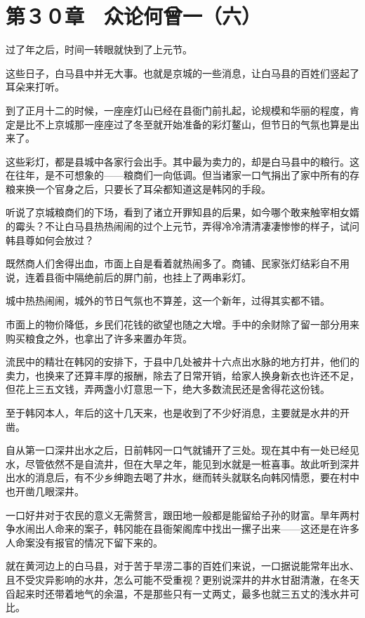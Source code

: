 \section{第３０章　众论何曾一（六）}

过了年之后，时间一转眼就快到了上元节。

这些日子，白马县中并无大事。也就是京城的一些消息，让白马县的百姓们竖起了耳朵来打听。

到了正月十二的时候，一座座灯山已经在县衙门前扎起，论规模和华丽的程度，肯定是比不上京城那一座座过了冬至就开始准备的彩灯鳌山，但节日的气氛也算是出来了。

这些彩灯，都是县城中各家行会出手。其中最为卖力的，却是白马县中的粮行。这在往年，是不可想象的——粮商们一向低调。但当诸家一口气捐出了家中所有的存粮来换一个官身之后，只要长了耳朵都知道这是韩冈的手段。

听说了京城粮商们的下场，看到了诸立开罪知县的后果，如今哪个敢来触宰相女婿的霉头？不让白马县热热闹闹的过个上元节，弄得冷冷清清凄凄惨惨的样子，试问韩县尊如何会放过？

既然商人们舍得出血，市面上自是看着就热闹多了。商铺、民家张灯结彩自不用说，连着县衙中隔绝前后的屏门前，也挂上了两串彩灯。

城中热热闹闹，城外的节日气氛也不算差，这一个新年，过得其实都不错。

市面上的物价降低，乡民们花钱的欲望也随之大增。手中的余财除了留一部分用来购买粮食之外，也拿出了许多来置办年货。

流民中的精壮在韩冈的安排下，于县中几处被井十六点出水脉的地方打井，他们的卖力，也换来了还算丰厚的报酬，除去了日常开销，给家人换身新衣也许还不足，但花上三五文钱，弄两盏小灯意思一下，绝大多数流民还是舍得花这份钱。

至于韩冈本人，年后的这十几天来，也是收到了不少好消息，主要就是水井的开凿。

自从第一口深井出水之后，日前韩冈一口气就铺开了三处。现在其中有一处已经见水，尽管依然不是自流井，但在大旱之年，能见到水就是一桩喜事。故此听到深井出水的消息后，有不少乡绅跑去喝了井水，继而转头就联名向韩冈情愿，要在村中也开凿几眼深井。

一口好井对于农民的意义无需赘言，跟田地一般都是能留给子孙的财富。旱年两村争水闹出人命来的案子，韩冈能在县衙架阁库中找出一摞子出来——这还是在许多人命案没有报官的情况下留下来的。

就在黄河边上的白马县，对于苦于旱涝二事的百姓们来说，一口据说能常年出水、且不受灾异影响的水井，怎么可能不受重视？更别说深井的井水甘甜清澈，在冬天舀起来时还带着地气的余温，不是那些只有一丈两丈，最多也就三五丈的浅水井可比。

